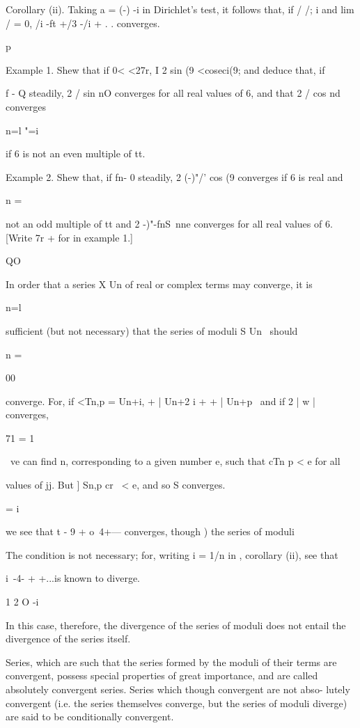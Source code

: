 Corollary (ii). Taking a = (-) -i in Dirichlet's test, it follows
that, if / /; i and lim / = 0, /i -ft +/3 -/i + . .  converges.

p

Example 1. Shew that if 0< <27r, I 2 sin (9 <coseci(9; and deduce
that, if

f - Q steadily, 2 / sin nO converges for all real values of 6, and
that 2 / cos nd converges

n=l "=i

if 6 is not an even multiple of tt.

Example 2. Shew that, if fn- 0 steadily, 2 (-)"/' cos (9 converges if
6 is real and

n = \

not an odd multiple of tt and 2 -)"-fnS\ nne converges for all real
values of 6. [Write 7r + for in example 1.]


QO

In order that a series X Un of real or complex terms may converge, it
is

n=l

sufficient (but not necessary) that the series of moduli S Un \ should

n = \

00

converge. For, if <Tn,p = Un+i, + | Un+2 i +    + | Un+p \ and if
2 | w | converges,

71 = 1

\ ve can find n, corresponding to a given number e, such that cTn p <
e for all

values of jj. But ] Sn,p cr \ < e, and so S converges.

  = i

we see that t - 9 + o~4+--- converges, though ) the series of
moduli

The condition is not necessary; for, writing i = 1/n in ,
corollary (ii), see that

i\ -4- + +...is known to diverge.

1 2 O -i

In this case, therefore, the divergence of the series of moduli does
not entail the divergence of the series itself.

Series, which are such that the series formed by the moduli of their
terms are convergent, possess special properties of great importance,
and are called absolutely convergent series. Series which though
convergent are not abso- lutely convergent (i.e. the series themselves
converge, but the series of moduli diverge) are said to be
conditionally convergent.

